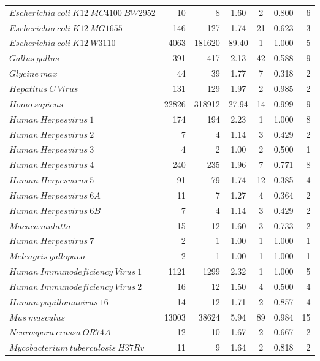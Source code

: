 \begin{table}[h]
\begin{tabular}{@{\makebox[2em][r]{\rownumber\space}} | lrrcccr}
        $ Escherichia \ coli \ K12 \ MC4100 \ BW2952 $ & 10 & 8 & 1.60 & 2 & 0.800 & 6 \\ 
        $ Escherichia \ coli \ K12 \ MG1655 $ & 146 & 127 & 1.74 & 21 & 0.623 & 3 \\ 
        $ Escherichia \ coli \ K12 \ W3110 $ & 4063 & 181620 & 89.40 & 1 & 1.000 & 5 \\ 
        $ Gallus \ gallus $ & 391 & 417 & 2.13 & 42 & 0.588 & 9 \\ 
        $ Glycine \ max $ & 44 & 39 & 1.77 & 7 & 0.318 & 2 \\ 
        $ Hepatitus \ C \ Virus $ & 131 & 129 & 1.97 & 2 & 0.985 & 2 \\ 
        $ Homo \ sapiens $ & 22826 & 318912 & 27.94 & 14 & 0.999 & 9 \\ 
        $ Human \ Herpesvirus \ 1 $ & 174 & 194 & 2.23 & 1 & 1.000 & 8 \\ 
        $ Human \ Herpesvirus \ 2 $ & 7 & 4 & 1.14 & 3 & 0.429 & 2 \\ 
        $ Human \ Herpesvirus \ 3 $ & 4 & 2 & 1.00 & 2 & 0.500 & 1 \\ 
        $ Human \ Herpesvirus \ 4 $ & 240 & 235 & 1.96 & 7 & 0.771 & 8 \\ 
        $ Human \ Herpesvirus \ 5 $ & 91 & 79 & 1.74 & 12 & 0.385 & 4 \\ 
        $ Human \ Herpesvirus \ 6A $ & 11 & 7 & 1.27 & 4 & 0.364 & 2 \\ 
        $ Human \ Herpesvirus \ 6B $ & 7 & 4 & 1.14 & 3 & 0.429 & 2 \\ 
        $ Macaca \ mulatta $ & 15 & 12 & 1.60 & 3 & 0.733 & 2 \\ 
        $ Human \ Herpesvirus \ 7 $ & 2 & 1 & 1.00 & 1 & 1.000 & 1 \\ 
        $ Meleagris \ gallopavo $ & 2 & 1 & 1.00 & 1 & 1.000 & 1 \\ 
        $ Human \ Immunodeficiency \ Virus \ 1 $ & 1121 & 1299 & 2.32 & 1 & 1.000 & 5 \\ 
        $ Human \ Immunodeficiency \ Virus \ 2 $ & 16 & 12 & 1.50 & 4 & 0.500 & 4 \\ 
        $ Human \ papillomavirus \ 16 $ & 14 & 12 & 1.71 & 2 & 0.857 & 4 \\ 
        $ Mus \ musculus $ & 13003 & 38624 & 5.94 & 89 & 0.984 & 15 \\ 
        $ Neurospora \ crassa \ OR74A $ & 12 & 10 & 1.67 & 2 & 0.667 & 2 \\ 
        $ Mycobacterium \ tuberculosis \ H37Rv $ & 11 & 9 & 1.64 & 2 & 0.818 & 2 \\ 

\end{tabular}
\end{table}
